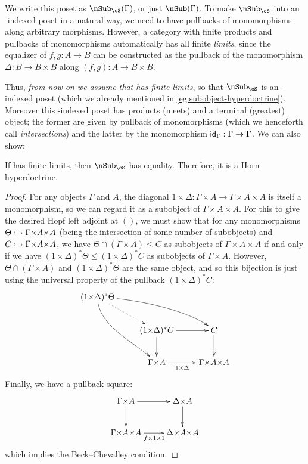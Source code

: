 We write this poset as $\sub_\cS(\Gamma)$, or just $\sub(\Gamma)$.
To make $\sub_\cS$ into an \cS-indexed poset in a natural way, we need \cS to have pullbacks of monomorphisms along arbitrary morphisms.
However, a category with finite products and pullbacks of monomorphisms automatically has all finite \emph{limits}, since the equalizer of $f,g:A\to B$ can be constructed as the pullback of the monomorphism $\Delta:B\to B\times B$ along $(f,g):A\to B\times B$.

Thus, \emph{from now on we assume that \cS has finite limits}, so that $\sub_\cS$ is an \cS-indexed poset (which we already mentioned in \cref{eg:subobject-hyperdoctrine}).
Moreover this \cS-indexed poset has products (meets) and a terminal (greatest) object; the former are given by pullback of monomorphisms (which we henceforth call \emph{intersections}) and the latter by the monomorphism $\mathsf{id}_\Gamma : \Gamma \to \Gamma$.
We can also show:

\begin{thm}\label{thm:horn-subobjects}
  If \cS has finite limits, then $\sub_\cS$ has equality.
  Therefore, it is a Horn hyperdoctrine.
\end{thm}
\begin{proof}
  For any objects $\Gamma$ and $A$, the diagonal $1\times \Delta : \Gamma\times A \to \Gamma\times A\times A$ is itself a monomorphism, so we can regard it as a subobject of $\Gamma\times A\times A$.
  For this to give the desired Hopf left adjoint at $()$, we must show that for any monomorphisms $\Theta \mono \Gamma\times A\times A$ (being the intersection of some number of subobjects) and $C \mono \Gamma\times A\times A$, we have $\Theta \cap (\Gamma\times A) \le C$ as subobjects of $\Gamma\times A\times A$ if and only if we have $(1\times \Delta)^* \Theta \le (1\times \Delta)^* C$ as subobjects of $\Gamma\times A$.
  However, $\Theta \cap (\Gamma\times A)$ and $(1\times \Delta)^* \Theta$ are the same object, and so this bijection is just using the universal property of the pullback $(1\times \Delta)^* C$:
  \[ \xymatrix{ (1\times \Delta)^* \Theta \ar@(r,ul)[drr] \ar@(d,ul)[ddr] \ar@{.>}[dr] \\
    & (1\times \Delta)^* C \ar[d] \ar[r] & C \ar[d]\\
    & \Gamma\times A \ar[r]_-{1\times\Delta} & \Gamma\times A\times A } \]
  Finally, we have a pullback square:
  \[ \xymatrix{ \Gamma\times A \ar[r] \ar[d] & \Delta\times A \ar[d] \\
    \Gamma\times A\times A \ar[r]_{f\times 1\times 1} & \Delta\times A\times A } \]
  which implies the Beck--Chevalley condition.
\end{proof}

